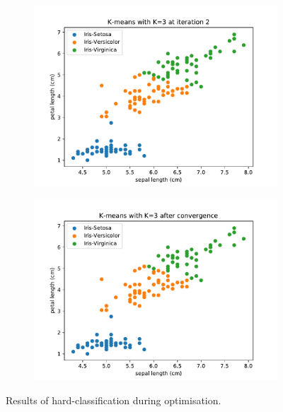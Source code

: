\documentclass{article}
\begin{document}
\begin{figure}[!ht]
{\begin{subfigure}{0.6\textwidth}
	\includegraphics[width=\textwidth]{./Figures/2_1_Kmeans_iter2}
	\end{subfigure}
	\begin{subfigure}{0.6\textwidth}
	\includegraphics[width=\textwidth]{./Figures/2_1_Kmeans_converged}
	\end{subfigure}
	}	
	\caption{Results of hard-classification during optimisation.}
	\label{2_1_Kmeans_iter}
\end{figure}
\end{document}
